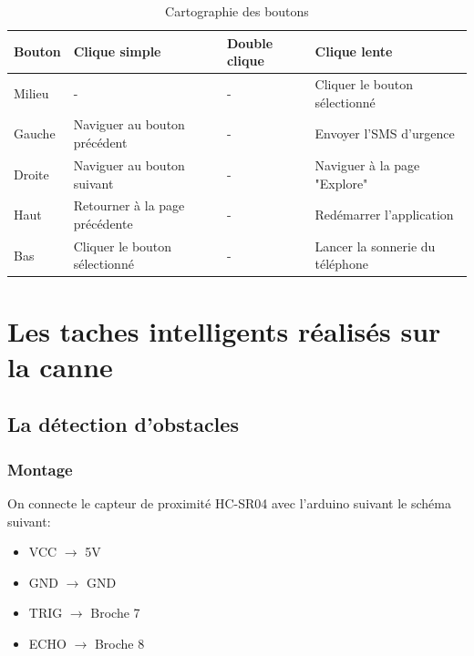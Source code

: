 

\bgroup
\def\arraystretch{1.5}%
\begin{table}[!htbp]
    \centering
    \begin{tabular}{|C{1.7cm}|C{5cm}|C{1.7cm}|C{5cm}|}
        \hline
        Bouton & Clique simple & Double clique & Clique lente \\
        \hline
        Milieu & - & - & Cliquer le bouton sélectionné \\
        \hline
        Gauche & Naviguer au bouton précédent & - & Envoyer l'SMS d'urgence \\
        \hline
        Droite & Naviguer au bouton suivant & - & Naviguer à la page "Explore" \\
        \hline
        Haut & Retourner à la page précédente & - & Redémarrer l’application \\
        \hline
        Bas & Cliquer le bouton sélectionné & - & Lancer la sonnerie du téléphone \\
        \hline
    \end{tabular}
    \caption{Cartographie des boutons}
\end{table}
\egroup

\section{Les taches intelligents réalisés sur la canne}

\subsection{La détection d’obstacles}

\subsubsection{Montage}
On connecte le capteur de proximité HC-SR04 avec l'arduino suivant le schéma suivant:
\begin{itemize}
    \item VCC $\rightarrow$ 5V
    \item GND $\rightarrow$ GND
    \item TRIG $\rightarrow$ Broche 7
    \item ECHO $\rightarrow$ Broche 8
\end{itemize}

\vspace{18pt}

